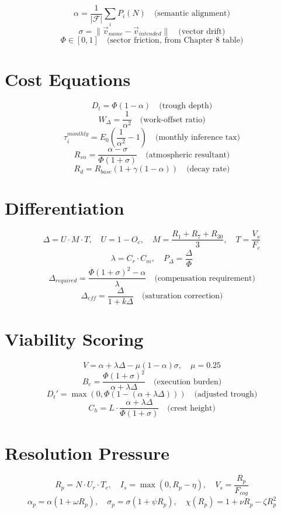 \documentclass[12pt, openany]{book}
\theoremstyle{thmstyle}
\theoremstyle{defstyle}
\begin{document}
\[
\alpha = \frac{1}{|\mathcal{F}|}\sum_i P_i(N) \quad \text{(semantic alignment)}
\]
\[
\sigma = \|\vec{v}_{name} - \vec{v}_{intended}\| \quad \text{(vector drift)}
\]
\[
\Phi \in [0,1] \quad \text{(sector friction, from Chapter 8 table)}
\]

\section*{Cost Equations}

\[
D_t = \Phi(1-\alpha) \quad \text{(trough depth)}
\]
\[
W_\Delta = \frac{1}{\alpha^2} \quad \text{(work-offset ratio)}
\]
\[
\tau_i^{monthly} = E_0\!\left(\frac{1}{\alpha^2}-1\right) \quad \text{(monthly inference tax)}
\]
\[
R_{sn} = \frac{\alpha - \sigma}{\Phi(1+\sigma)} \quad \text{(atmospheric resultant)}
\]
\[
R_d = R_{base}(1+\gamma(1-\alpha)) \quad \text{(decay rate)}
\]

\section*{Differentiation}

\[
\Delta = U \cdot M \cdot T, \quad U = 1-O_c, \quad M = \frac{R_1+R_7+R_{30}}{3}, \quad T = \frac{V_s}{F_c}
\]
\[
\lambda = C_r \cdot C_m, \quad P_\Delta = \frac{\Delta}{\Phi}
\]
\[
\Delta_{required} = \frac{\Phi(1+\sigma)^2 - \alpha}{\lambda} \quad \text{(compensation requirement)}
\]
\[
\Delta_{eff} = \frac{\Delta}{1+k\Delta} \quad \text{(saturation correction)}
\]

\section*{Viability Scoring}

\[
V = \alpha + \lambda\Delta - \mu(1-\alpha)\sigma, \quad \mu = 0.25
\]
\[
B_e = \frac{\Phi(1+\sigma)^2}{\alpha+\lambda\Delta} \quad \text{(execution burden)}
\]
\[
D_t' = \max(0, \Phi(1-(\alpha+\lambda\Delta))) \quad \text{(adjusted trough)}
\]
\[
C_h = L \cdot \frac{\alpha+\lambda\Delta}{\Phi(1+\sigma)} \quad \text{(crest height)}
\]

\section*{Resolution Pressure}

\[
R_p = N \cdot U_r \cdot T_c, \quad I_s = \max(0, R_p - \eta), \quad V_s = \frac{R_p}{F_{cog}}
\]
\[
\alpha_p = \alpha(1+\omega R_p), \quad \sigma_p = \sigma(1+\psi R_p), \quad \chi(R_p) = 1+\nu R_p - \zeta R_p^2
\]
\end{document}
